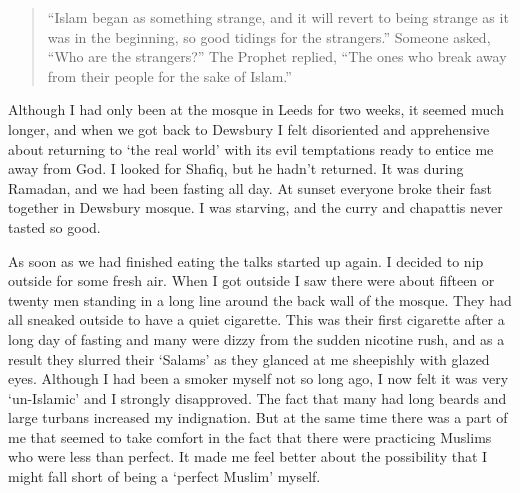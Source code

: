 \documentclass[12pt]{memoir}
\newcommand{\cmt}[2]{#1} %
\begin{document}
\begin{quote}
“Islam began as something strange,
and it will revert to being strange as it was in the beginning,
so good tidings for the strangers.”
Someone asked, “Who are the strangers?”
The Prophet replied,
“The ones who break away from their people for the sake of Islam.”
\end{quote}

Although I had only been at the mosque in Leeds for two weeks,
it seemed much longer, and when we got back to Dewsbury I felt disoriented
and apprehensive about returning to ‘the real world’
with its evil temptations ready to entice me away from God.
I looked for Shafiq, but he hadn’t returned.
It was \cmt{during}{Grammar? -> "It was Ramadan..."} Ramadan,
and we had been fasting all day.
At sunset everyone broke their fast together in Dewsbury mosque.
I was starving, and the curry and chapattis never tasted so good.

As soon as we had finished eating the talks started up again.
I decided to nip outside for some fresh air.
When I got outside I saw there were about fifteen or twenty men
standing in a long line around the back wall of the mosque.
They had all sneaked outside to have a quiet cigarette.
This was their first cigarette after a long day of fasting
and many were dizzy from the sudden nicotine rush,
and as a result they slurred their ‘Salams’
as they glanced at me sheepishly with glazed eyes.
Although I had been a smoker myself not so long ago,
I now felt it was very ‘un-Islamic’ and I strongly disapproved.
The fact that many had long beards and large turbans increased my indignation.
But at the same time there was a part of me that seemed to take comfort
in the fact that there were practicing Muslims who were less than perfect.
It made me feel better about the possibility
that I might fall short of being a ‘perfect Muslim’ myself.
\end{document}

